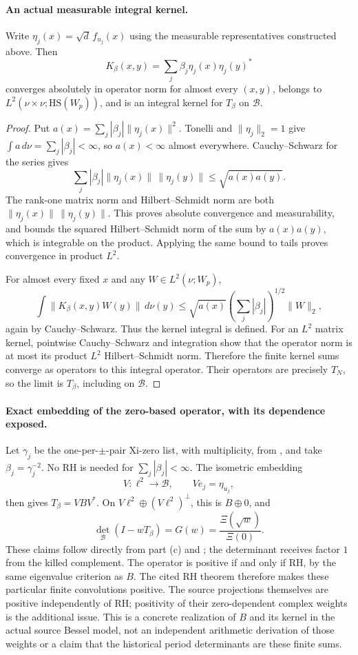 \paragraph{An actual measurable integral kernel.}
Write \(\eta_j(x)=\sqrt d\,f_{u_j}(x)\) using the measurable
representatives constructed above. Then
\[
 K_\beta(x,y)=\sum_j\beta_j\eta_j(x)\eta_j(y)^*
\]
converges absolutely in operator norm for almost every \((x,y)\),
belongs to \(L^2(\nu\times\nu;\mathrm{HS}(W_p))\), and is an
integral kernel for \(T_\beta\) on \(\mathcal B\).
\begin{proof}
Put \(a(x)=\sum_j|\beta_j|\|\eta_j(x)\|^2\).
Tonelli and \(\|\eta_j\|_2=1\) give
\(\int a\,d\nu=\sum_j|\beta_j|<\infty\), so \(a(x)<\infty\)
almost everywhere. Cauchy--Schwarz for the series gives
\[
 \sum_j|\beta_j|\|\eta_j(x)\|\,\|\eta_j(y)\|
 \le\sqrt{a(x)a(y)}.
\]
The rank-one matrix norm and Hilbert--Schmidt norm are both
\(\|\eta_j(x)\|\,\|\eta_j(y)\|\).
This proves absolute convergence and measurability, and bounds
the squared Hilbert--Schmidt norm of the sum by \(a(x)a(y)\),
which is integrable on the product. Applying the same bound
to tails proves convergence in product \(L^2\).

For almost every fixed \(x\) and any \(W\in L^2(\nu;W_p)\),
\[
 \int\|K_\beta(x,y)W(y)\|\,d\nu(y)
 \le\sqrt{a(x)}\left(\sum_j|\beta_j|\right)^{1/2}\|W\|_2,
\]
again by Cauchy--Schwarz. Thus the kernel integral is defined.
For an \(L^2\) matrix kernel, pointwise Cauchy--Schwarz and
integration show that the operator norm is at most its
product \(L^2\) Hilbert--Schmidt norm. Therefore the finite
kernel sums converge as operators to this integral operator.
Their operators are precisely \(T_N\), so the limit is
\(T_\beta\), including on \(\mathcal B\).
\end{proof}

\paragraph{Exact embedding of the zero-based operator, with its dependence exposed.}
Let \(\gamma_j\) be the one-per-\(\pm\)-pair Xi-zero list, with
multiplicity, from , and take
\(\beta_j=\gamma_j^{-2}\).
No RH is needed for \(\sum_j|\beta_j|<\infty\).
The isometric embedding
\[
 V:\ell^2\longrightarrow\mathcal B,\qquad
 Ve_j=\eta_{u_j},
\]
then gives \(T_\beta=VBV^*\). On
\(V\ell^2\oplus(V\ell^2)^\perp\), this is \(B\oplus0\), and
\[
 \det_{\mathcal B}(I-wT_\beta)=G(w)
 =\frac{\Xi(\sqrt w)}{\Xi(0)}.
\]
These claims follow directly from part (c) and ;
the determinant receives factor \(1\) from the killed complement.
The operator is positive if and only if RH, by the same
eigenvalue criterion as \(B\). The cited RH theorem therefore
makes these particular finite convolutions positive.
The source projections themselves are positive independently
of RH; positivity of their zero-dependent complex weights is
the additional issue. This is a concrete realization of \(B\)
and its kernel in the actual source Bessel model, not an
independent arithmetic derivation of those weights or a claim
that the historical period determinants are these finite sums.

